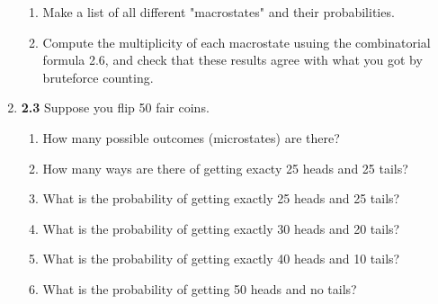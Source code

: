 \documentclass[fleqn]{article}
\begin{document}
\begin{enumerate}
\begin{enumerate}

      \item Make a list of all different "macrostates" and their probabilities.


      \item Compute the multiplicity of each macrostate usuing the combinatorial formula 2.6, and check 
      that these results agree with what you got by bruteforce counting.

      
    \end{enumerate}


    \item \textbf{2.3} Suppose you flip 50 fair coins.
    \begin{enumerate}
      \item How many possible outcomes (microstates) are there?


      \item How many ways are there of getting exacty 25 heads and 25 tails?


      \item What is the probability of getting exactly 25 heads and 25 tails?


      \item What is the probability of getting exactly 30 heads and 20 tails?
      

      \item What is the probability of getting exactly 40 heads and 10 tails?


      \item What is the probability of getting 50 heads and no tails?


\end{enumerate}
\end{enumerate}
\end{document}
